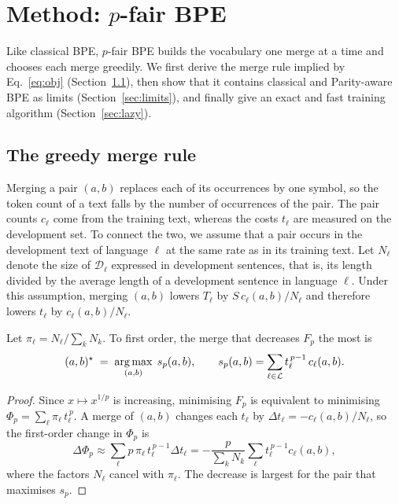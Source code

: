 \section{Method: $p$-fair BPE}
\label{sec:method}

Like classical BPE, $p$-fair BPE builds the vocabulary one merge at a time and chooses each
merge greedily. We first derive the merge rule implied by Eq.~\eqref{eq:obj}
(Section~\ref{sec:rule}), then show that it contains classical and Parity-aware BPE as
limits (Section~\ref{sec:limits}), and finally give an exact and fast training algorithm
(Section~\ref{sec:lazy}).

\subsection{The greedy merge rule}
\label{sec:rule}

Merging a pair $(a,b)$ replaces each of its occurrences by one symbol, so the token count
of a text falls by the number of occurrences of the pair. The pair counts $c_\ell$ come from
the training text, whereas the costs $t_\ell$ are measured on the development set. To
connect the two, we assume that a pair occurs in the development text of language $\ell$ at
the same rate as in its training text. Let $N_\ell$ denote the size of $\mathcal{D}_\ell$
expressed in development sentences, that is, its length divided by the average length of a
development sentence in language $\ell$. Under this assumption, merging $(a,b)$ lowers
$T_\ell$ by $S\,c_\ell(a,b)/N_\ell$ and therefore lowers $t_\ell$ by $c_\ell(a,b)/N_\ell$.

\begin{proposition}
\label{prop:rule}
Let $\pi_\ell = N_\ell/\sum_k N_k$. To first order, the merge that decreases $F_p$ the most
is
\begin{equation}
  (a,b)^\star \;=\; \operatorname*{arg\,max}_{(a,b)}\; s_p(a,b), \qquad
  s_p(a,b) = \sum_{\ell\in\mathcal{L}} t_\ell^{\,p-1}\, c_\ell(a,b).
  \label{eq:rule}
\end{equation}
\end{proposition}

\begin{proof}
Since $x\mapsto x^{1/p}$ is increasing, minimising $F_p$ is equivalent to minimising
$\Phi_p=\sum_\ell \pi_\ell\, t_\ell^{\,p}$. A merge of $(a,b)$ changes each $t_\ell$ by
$\Delta t_\ell = -c_\ell(a,b)/N_\ell$, so the first-order change in $\Phi_p$ is
\begin{equation*}
  \Delta\Phi_p \approx \sum_\ell p\,\pi_\ell\, t_\ell^{\,p-1}\Delta t_\ell
  = -\frac{p}{\sum_k N_k}\sum_\ell t_\ell^{\,p-1} c_\ell(a,b),
\end{equation*}
where the factors $N_\ell$ cancel with $\pi_\ell$. The decrease is largest for the pair
that maximises $s_p$.
\end{proof}

